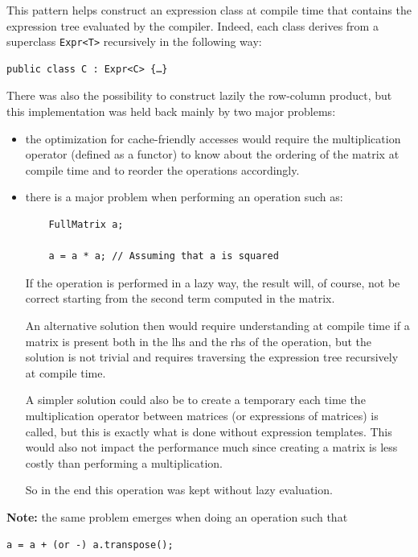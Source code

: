 \documentclass{article}
\begin{document}
This pattern helps construct an expression class at compile time that contains the expression tree evaluated by the compiler. Indeed, each class derives from a superclass \texttt{Expr<T>} recursively in the following way:

\begin{verbatim}
public class C : Expr<C> {…}
\end{verbatim}

There was also the possibility to construct lazily the row-column product, but this implementation was held back mainly by two major problems:

\begin{itemize}
    \item the optimization for cache-friendly accesses would require the multiplication operator (defined as a functor) to know about the ordering of the matrix at compile time and to reorder the operations accordingly.
    \item there is a major problem when performing an operation such as:

    \begin{verbatim}
    FullMatrix a;

    a = a * a; // Assuming that a is squared
    \end{verbatim}

    If the operation is performed in a lazy way, the result will, of course, not be correct starting from the second term computed in the matrix.

    An alternative solution then would require understanding at compile time if a matrix is present both in the lhs and the rhs of the operation, but the solution is not trivial and requires traversing the expression tree recursively at compile time.

    A simpler solution could also be to create a temporary each time the multiplication operator between matrices (or expressions of matrices) is called, but this is exactly what is done without expression templates. This would also not impact the performance much since creating a matrix is less costly than performing a multiplication.

    So in the end this operation was kept without lazy evaluation.
\end{itemize}

\textbf{Note:} the same problem emerges when doing an operation such that

\begin{verbatim}
a = a + (or -) a.transpose();
\end{verbatim}
\end{document}
